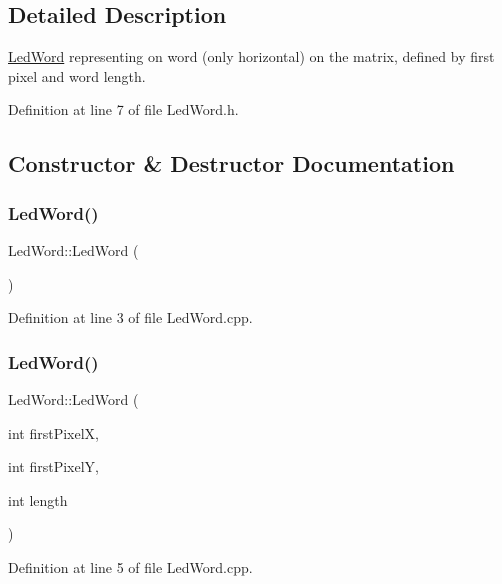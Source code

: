 \subsection{Detailed Description}
\mbox{\hyperlink{class_led_word}{Led\+Word}} representing on word (only horizontal) on the matrix, defined by first pixel and word length. 

Definition at line 7 of file Led\+Word.\+h.



\subsection{Constructor \& Destructor Documentation}
\mbox{\label{class_led_word_ac6eaebc78df7dae57ee83e21d400d9cf}} 
\subsubsection{\texorpdfstring{LedWord()}{LedWord()}\hspace{0.1cm}{\footnotesize\ttfamily [1/2]}}
{\footnotesize\ttfamily Led\+Word\+::\+Led\+Word (\begin{DoxyParamCaption}{ }\end{DoxyParamCaption})}



Definition at line 3 of file Led\+Word.\+cpp.

\mbox{\label{class_led_word_a3be466e30df512d7d4baf1e48819df48}} 
\subsubsection{\texorpdfstring{LedWord()}{LedWord()}\hspace{0.1cm}{\footnotesize\ttfamily [2/2]}}
{\footnotesize\ttfamily Led\+Word\+::\+Led\+Word (\begin{DoxyParamCaption}\item[{int}]{first\+PixelX,  }\item[{int}]{first\+PixelY,  }\item[{int}]{length }\end{DoxyParamCaption})}



Definition at line 5 of file Led\+Word.\+cpp.




